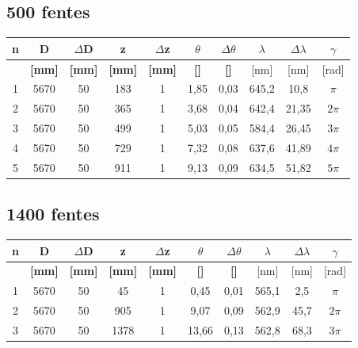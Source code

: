 \documentclass[11pt,a4paper]{report}
\begin{document}
	\subsection{500 fentes}
	\begin{center}	
	\begin{tabular}{|c|c|c|c|c|c|c|c|c|c|}
		\hline
		\bf n & \bf D & \bf $\Delta$D & \bf z & \bf $\Delta$z & \bf $\theta$ & \bf $\Delta \theta$ & $\lambda$& $\Delta \lambda$&\bf $\gamma$ \\
		\hline
		 & \bf [mm] & \bf [mm] & \bf [mm] & \bf [mm] & \bf [\degre]  & \bf [\degre]  &  [nm] & [nm] & [rad]\\
		\hline
		1 & 5670 & 50 & 183 &   1&1,85&0,03&645,2&10,8 &$\pi$\\
		2 & 5670 & 50 & 365 &  1&3,68&0,04&642,4&21,35&$2\pi$\\
		3 & 5670 & 50 & 499 &  1&5,03&0,05&584,4&26,45&$3\pi$\\
		4 & 5670 & 50 & 729 &  1&7,32&0,08&637,6&41,89&$4\pi$\\
		5 & 5670 & 50 & 911 &  1&9,13&0,09&634,5&51,82&$5\pi$\\
		\hline
	\end{tabular}
	\end{center}
	\subsection{1400 fentes}
	\begin{center}	
	\begin{tabular}{|c|c|c|c|c|c|c|c|c|c|}
		\hline
		\bf n & \bf D & \bf $\Delta$D & \bf z & \bf $\Delta$z & \bf $\theta$ & \bf $\Delta \theta$ & $\lambda$& $\Delta \lambda$&\bf $\gamma$ \\
		\hline
		 & \bf [mm] & \bf [mm] & \bf [mm] & \bf [mm] & \bf [\degre]  & \bf [\degre]  &  [nm] & [nm] & [rad]\\
		\hline
		1 & 5670 & 50 & 45 &   1&0,45&0,01&565,1&2,5&$\pi$\\
		2 & 5670 & 50 & 905 &  1&9,07&0,09&562,9&45,7&$2\pi$\\
		3 & 5670 & 50 & 1378 &  1&13,66&0,13&562,8&68,3&$3\pi$\\
		\hline
	\end{tabular}
	\end{center}
\end{document}
